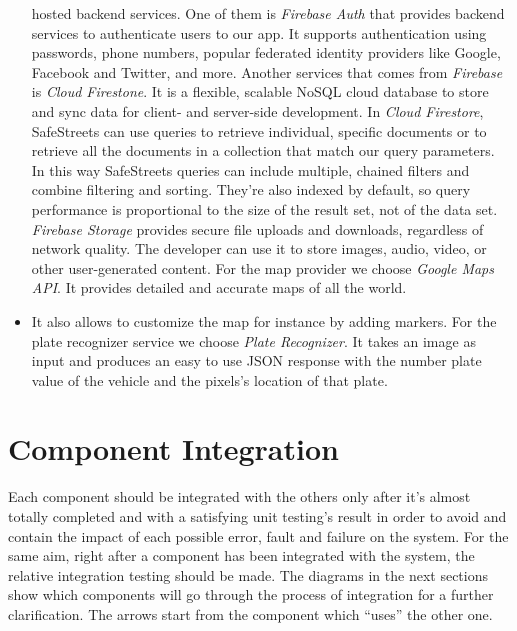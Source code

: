 \documentclass[../RASD.tex]{subfiles}
\begin{document}
\begin{itemize}
        hosted backend services.
        One of them is \textit{Firebase Auth} that provides backend services to authenticate users to our app.
        It supports authentication using passwords, phone numbers, popular federated identity providers like Google, Facebook and Twitter, and more.
        Another services that comes from \textit{Firebase} is \textit{Cloud Firestone}.
        It is a flexible, scalable NoSQL cloud database to store and sync data for client- and server-side development.
        In \textit{Cloud Firestore}, SafeStreets can use queries to retrieve individual, specific documents or to retrieve all the documents
        in a collection that match our query parameters.
        In this way SafeStreets queries can include multiple, chained filters and combine filtering and sorting.
        They're also indexed by default, so query performance is proportional to the size of the result set, not of the data set.
        \textit{Firebase Storage} provides secure file uploads and downloads, regardless of network quality.
        The developer can use it to store images, audio, video, or other user-generated content.
        For the map provider we choose \textit{Google Maps API}.
        It provides detailed and accurate maps of all the world.
        \item It also allows to customize the map for instance by adding markers.
        For the plate recognizer service we choose \textit{Plate Recognizer}.
        It takes an image as input and produces an easy to use JSON response with the number plate value of the vehicle and the pixels's location of that plate.
    \end{itemize}
    \newpage
    \section{Component Integration}\label{sec:component-integration}
    Each component should be integrated with the others only after it’s almost totally completed and with a satisfying unit testing’s result in order
    to avoid and contain the impact of each possible error, fault and failure on the system.
    For the same aim, right after a component has been integrated with the system, the relative integration testing should be made.
    The diagrams in the next sections show which components will go through the process of integration for a further clarification.
    The arrows start from the component which “uses” the other one.
\end{document}
